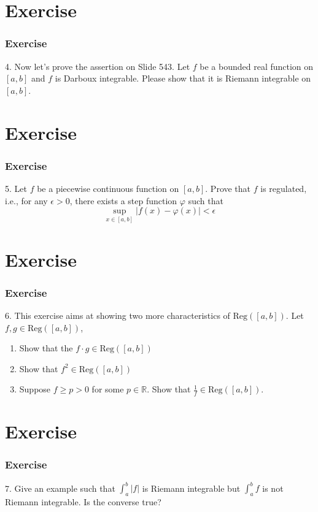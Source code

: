 \documentclass[12pt, t]{beamer}
\begin{document}
\section{Exercise}
\begin{frame}
    \frametitle{Exercise}
4. Now let's prove the assertion on Slide 543. Let $f$ be a bounded real function on $[a,b]$ and $f$ is Darboux integrable. Please show that it is Riemann integrable on $[a,b]$.

\end{frame}

\section{Exercise}
\begin{frame}
    \frametitle{Exercise}
5. Let $f$ be a piecewise continuous function on $[a,b]$. Prove that $f$ is regulated, i.e., for any $\epsilon>0$, there exists a step function $\varphi$ such that 
\begin{equation*}
    \sup_{x\in[a,b]}|f(x)-\varphi(x)|<\epsilon
\end{equation*}
\end{frame}

\section{Exercise}
\begin{frame}
    \frametitle{Exercise}
6. This exercise aims at showing two more characteristics of $\text{Reg}([a,b])$. Let $f,g\in\text{Reg}([a,b])$, 
\begin{enumerate}
    \item Show that the $f\cdot g\in\text{Reg}([a,b])$
    \item Show that $f^2\in\text{Reg}([a,b])$
    \item Suppose $f\geq p>0$ for some $p\in \mathbb{R}$. Show that $\frac{1}{f}\in\text{Reg}([a,b])$.
\end{enumerate}
\end{frame}

\section{Exercise}
\begin{frame}
    \frametitle{Exercise}
7. Give an example such that $\int_a^b|f|$ is Riemann integrable but $\int_a^bf$ is not Riemann integrable. Is the converse true?
\end{frame}
\end{document}
